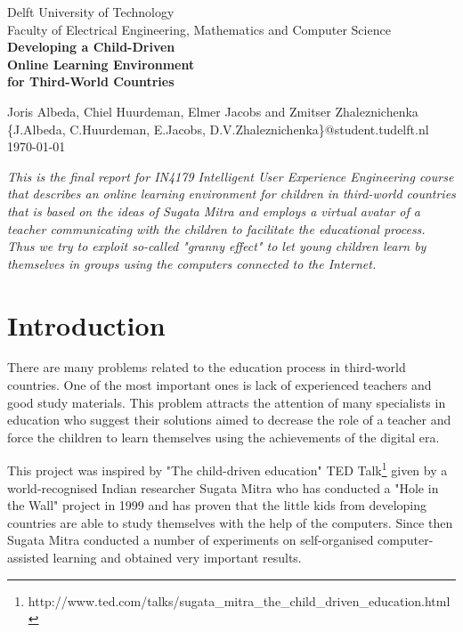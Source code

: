 \documentclass[a4paper]{article}
\begin{document}
\begin{titlepage}

\begin{center}

Delft University of Technology\\
Faculty of Electrical Engineering, Mathematics and Computer Science\\[3cm]
\huge \bf{Developing a Child-Driven \\ Online Learning Environment \\ for Third-World Countries}\\[15cm]
\end{center}

\large \noindent 
Joris Albeda, Chiel Huurdeman, Elmer Jacobs and Zmitser Zhaleznichenka\\
\{J.Albeda, C.Huurdeman, E.Jacobs, D.V.Zhaleznichenka\}@student.tudelft.nl\\

\noindent\today

\end{titlepage}

\setcounter{secnumdepth}{3}

\abstract \emph{This is the final report for IN4179 Intelligent User Experience Engineering course that describes an online learning environment for children in third-world countries that is based on the ideas of Sugata Mitra and employs a virtual avatar of a teacher communicating with the children to facilitate the educational process. Thus we try to exploit so-called "granny effect" to let young children learn by themselves in groups using the computers connected to the Internet.}

\section{Introduction}

There are many problems related to the education process in third-world countries. One of the most important ones is lack of experienced teachers and good study materials. This problem attracts the attention of many specialists in education who suggest their solutions aimed to decrease the role of a teacher and force the children to learn themselves using the achievements of the digital era.

This project was inspired by "The child-driven education" TED Talk\footnote{http://www.ted.com/talks/sugata\_mitra\_the\_child\_driven\_education.html} given by a world-recognised Indian researcher Sugata Mitra who has conducted a "Hole in the Wall" project in 1999 and has proven that the little kids from developing countries are able to study themselves with the help of the computers. Since then Sugata Mitra conducted a number of experiments on self-organised computer-assisted learning and obtained very important results. 
\end{document}
